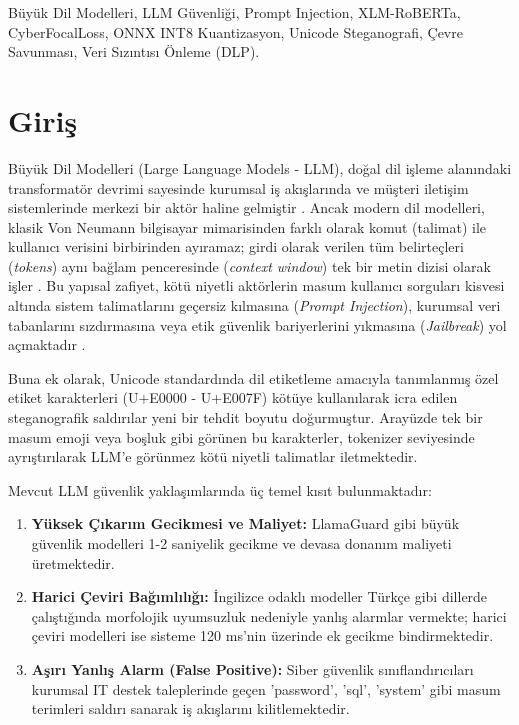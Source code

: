 \documentclass[conference]{IEEEtran}
\begin{document}
\begin{IEEEkeywords}
Büyük Dil Modelleri, LLM Güvenliği, Prompt Injection, XLM-RoBERTa, CyberFocalLoss, ONNX INT8 Kuantizasyon, Unicode Steganografi, Çevre Savunması, Veri Sızıntısı Önleme (DLP).
\end{IEEEkeywords}

\section{Giriş}
Büyük Dil Modelleri (Large Language Models - LLM), doğal dil işleme alanındaki transformatör devrimi sayesinde kurumsal iş akışlarında ve müşteri iletişim sistemlerinde merkezi bir aktör haline gelmiştir \cite{greshake2023}. Ancak modern dil modelleri, klasik Von Neumann bilgisayar mimarisinden farklı olarak komut (talimat) ile kullanıcı verisini birbirinden ayıramaz; girdi olarak verilen tüm belirteçleri (\textit{tokens}) aynı bağlam penceresinde (\textit{context window}) tek bir metin dizisi olarak işler \cite{perez2022}. Bu yapısal zafiyet, kötü niyetli aktörlerin masum kullanıcı sorguları kisvesi altında sistem talimatlarını geçersiz kılmasına (\textit{Prompt Injection}), kurumsal veri tabanlarını sızdırmasına veya etik güvenlik bariyerlerini yıkmasına (\textit{Jailbreak}) yol açmaktadır \cite{wei2023}.

Buna ek olarak, Unicode standardında dil etiketleme amacıyla tanımlanmış özel etiket karakterleri (U+E0000 - U+E007F) kötüye kullanılarak icra edilen steganografik saldırılar yeni bir tehdit boyutu doğurmuştur. Arayüzde tek bir masum emoji veya boşluk gibi görünen bu karakterler, tokenizer seviyesinde ayrıştırılarak LLM'e görünmez kötü niyetli talimatlar iletmektedir.

Mevcut LLM güvenlik yaklaşımlarında üç temel kısıt bulunmaktadır:
\begin{enumerate}
    \item \textbf{Yüksek Çıkarım Gecikmesi ve Maliyet:} LlamaGuard \cite{inan2023} gibi büyük güvenlik modelleri 1-2 saniyelik gecikme ve devasa donanım maliyeti üretmektedir.
    \item \textbf{Harici Çeviri Bağımlılığı:} İngilizce odaklı modeller Türkçe gibi dillerde çalıştığında morfolojik uyumsuzluk nedeniyle yanlış alarmlar vermekte; harici çeviri modelleri ise sisteme 120 ms'nin üzerinde ek gecikme bindirmektedir.
    \item \textbf{Aşırı Yanlış Alarm (False Positive):} Siber güvenlik sınıflandırıcıları kurumsal IT destek taleplerinde geçen 'password', 'sql', 'system' gibi masum terimleri saldırı sanarak iş akışlarını kilitlemektedir.
\end{enumerate}
\end{document}
